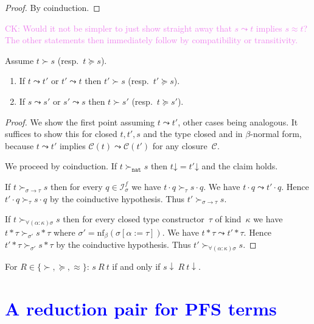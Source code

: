 \documentclass[a4paper,UKenglish,cleveref,autoref,numberwithinsect]{lipics-v2019}
\theoremstyle{definition}
\newcommand{\Iterms}{\mathcal{I}}
\newcommand{\arrtype}{\rightarrow}
\newcommand{\app}[2]{#1 \cdot #2}
\newcommand{\tapp}[2]{#1 * #2}
\newcommand{\subst}[2]{#1:=#2}
\newcommand{\arrW}{\leadsto}
\newcommand{\nat}{\mathtt{nat}}
\newcommand{\cl}{\mathcal{C}}
\newcommand{\nf}{\mathrm{nf}}
\newcommand{\da}{\mathord{\downarrow}}
\newcommand{\CK}[1]{\textcolor{violet}{CK: #1}}
\newcommand{\CKchange}[1]{\textcolor{blue}{#1}}
\begin{document}
\begin{proof}
  By coinduction.
\end{proof}

\CK{Would it not be simpler to just show straight away that $s \arrW t$
implies $s \approx t$?  The other statements then immediately follow by
compatibility or transitivity.}

\begin{lemma}\label{lem_succ_red}
  Assume $t \succ s$ (resp.~$t \succeq s$).
  \begin{enumerate}
  \item If $t \leadsto t'$ or $t' \leadsto t$ then $t' \succ s$
    (resp.~$t' \succeq s$).
  \item If $s \leadsto s'$ or $s' \leadsto s$ then $t \succ s'$
    (resp.~$t \succeq s'$).
  \end{enumerate}
\end{lemma}

\begin{proof}
  We show the first point assuming $t \leadsto t'$, other cases being
  analogous. It suffices to show this for closed $t,t',s$ and the type
  closed and in $\beta$-normal form, because $t \leadsto t'$ implies
  $\cl(t) \leadsto \cl(t')$ for any closure~$\cl$.

  We proceed by coinduction. If $t \succ_\nat s$ then $t\da = t'\da$
  and the claim holds.

  If $t \succ_{\sigma\arrtype\tau} s$ then for every $q \in
  \Iterms^f_\sigma$ we have $\app{t}{q} \succ_\tau \app{s}{q}$. We
  have $\app{t}{q} \leadsto \app{t'}{q}$. Hence $\app{t'}{q}
  \succ_\tau \app{s}{q}$ by the coinductive hypothesis. Thus $t'
  \succ_{\sigma\arrtype\tau} s$.

  If $t \succ_{\forall(\alpha:\kappa)\sigma} s$ then for every closed
  type constructor~$\tau$ of kind~$\kappa$ we have $\tapp{t}{\tau}
  \succ_{\sigma'} \tapp{s}{\tau}$ where $\sigma' =
  \nf_\beta(\sigma[\subst{\alpha}{\tau}])$. We have $\tapp{t}{\tau}
  \leadsto \tapp{t'}{\tau}$. Hence $\tapp{t'}{\tau} \succ_{\sigma'}
  \tapp{s}{\tau}$ by the coinductive hypothesis. Thus $t'
  \succ_{\forall(\alpha:\kappa)\sigma} s$.
\end{proof}

\begin{corollary}\label{cor_succ_da}
  For $R \in \{\succ,\succeq,\approx\}$: $s\ R\ t$ if and only if
  $s\downarrow\ R\ t\downarrow$.
\end{corollary}


\section{\CKchange{A reduction pair for PFS terms}}\label{sec_reduction_pairs}
\end{document}
